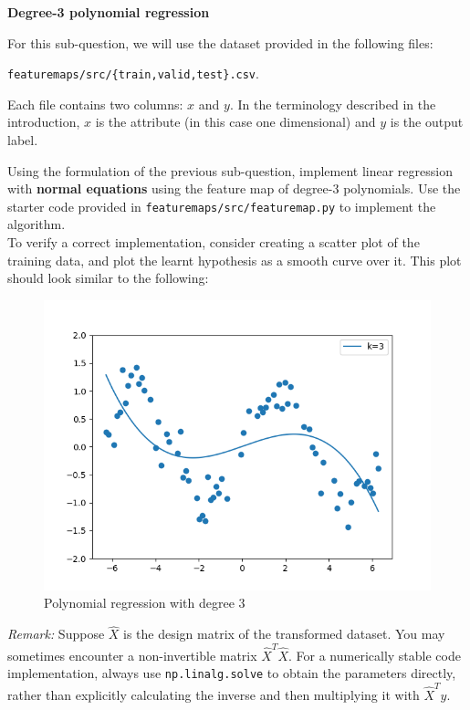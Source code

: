 \item {} {\bf Degree-3 polynomial regression}


For this sub-question, we will use the dataset provided in the following files:
%
\begin{center}
	\texttt{featuremaps/src/\{train,valid,test\}.csv}.
\end{center}
%

Each file contains two columns: $x$ and $y$. In the terminology described in the introduction, $x$ is the attribute (in this case one dimensional) and $y$ is the output label.

Using the formulation of the previous sub-question, implement linear regression with \textbf{normal equations} using the feature map of degree-3 polynomials. Use the starter code provided in \texttt{featuremaps/src/featuremap.py} to implement the algorithm.\\

To verify a correct implementation, consider creating a scatter plot of the training data, and plot the learnt hypothesis as a smooth curve over it.  This plot should look similar to the following:
\begin{figure}[H]
  \centering
  \includegraphics[width=0.65\linewidth]{featuremaps/src/large-poly3.png}
  \centering
\caption{Polynomial regression with degree 3}
\end{figure}

\emph{Remark: } Suppose $\widehat{X}$ is the design matrix of the transformed dataset. You may sometimes encounter a non-invertible matrix $\widehat{X}^T\widehat{X}$. For a numerically stable code implementation, always use \texttt{np.linalg.solve} to obtain the parameters directly, rather than explicitly calculating the inverse and then multiplying it with $\widehat{X}^Ty$.\\\\\\

